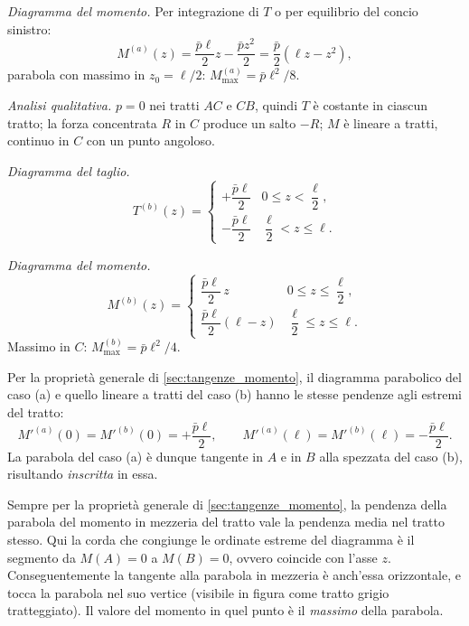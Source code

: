 \begin{esempio}
\begin{svolgimento}
		\textit{Diagramma del momento.} Per integrazione
		di $T$ o per equilibrio del concio sinistro:
		\[
		M^{(a)}(z) = \frac{\bar{p}\ell}{2}z
		- \frac{\bar{p}z^2}{2}
		= \frac{\bar{p}}{2}(\ell z - z^2),
		\]
		parabola con massimo in $z_0 = \ell/2$:
		$M^{(a)}_{\max} = \bar{p}\ell^2/8$.
		
		
		\textit{Analisi qualitativa.} $p = 0$ nei tratti
		$AC$ e $CB$, quindi $T$ è costante in ciascun
		tratto; la forza concentrata $R$ in $C$ produce
		un salto $-R$; $M$ è lineare a tratti, continuo
		in $C$ con un punto angoloso.
		
		\textit{Diagramma del taglio.}
		\[
		T^{(b)}(z) = \begin{cases}
			+\dfrac{\bar{p}\ell}{2} & 0 \leq z < \dfrac{\ell}{2}, \\[6pt]
			-\dfrac{\bar{p}\ell}{2} & \dfrac{\ell}{2} < z \leq \ell.
		\end{cases}
		\]
		
		\textit{Diagramma del momento.}
		\[
		M^{(b)}(z) = \begin{cases}
			\dfrac{\bar{p}\ell}{2}\,z
			& 0 \leq z \leq \dfrac{\ell}{2}, \\[6pt]
			\dfrac{\bar{p}\ell}{2}(\ell - z)
			& \dfrac{\ell}{2} \leq z \leq \ell.
		\end{cases}
		\]
		Massimo in $C$: $M^{(b)}_{\max} = \bar{p}\ell^2/4$.
		



		
		
		Per la proprietà generale di
		\ref{sec:tangenze_momento}, il diagramma parabolico
		del caso (a) e quello lineare a tratti del caso (b)
		hanno le stesse pendenze agli estremi del tratto:
		\[
		M'^{(a)}(0) = M'^{(b)}(0) = +\frac{\bar{p}\ell}{2},
		\qquad
		M'^{(a)}(\ell) = M'^{(b)}(\ell) = -\frac{\bar{p}\ell}{2}.
		\]
		La parabola del caso (a) è dunque tangente in
		$A$ e in $B$ alla spezzata del caso (b), risultando
		\emph{inscritta} in essa.
		
		Sempre per la proprietà generale di
		\ref{sec:tangenze_momento}, la pendenza della
		parabola del momento in mezzeria del tratto vale
		la pendenza media nel tratto stesso. Qui la corda
		che congiunge le ordinate estreme del diagramma è
		il segmento da $M(A) = 0$ a $M(B) = 0$, ovvero
		coincide con l'asse $z$. Conseguentemente la
		tangente alla parabola in mezzeria è anch'essa
		orizzontale, e tocca la parabola nel suo vertice
		(visibile in figura come tratto grigio tratteggiato).
		Il valore del momento in quel punto è il \emph{massimo}
		della parabola.
		

\end{svolgimento}
\end{esempio}
